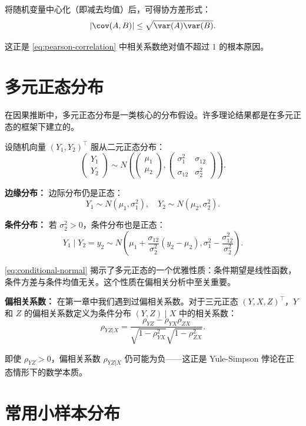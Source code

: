 将随机变量中心化（即减去均值）后，可得协方差形式：
\[
|\cov(A, B)| \leq \sqrt{\var(A)\var(B)} .
\]

这正是 \cref{eq:pearson-correlation} 中相关系数绝对值不超过 $1$ 的根本原因。

\section{多元正态分布}

在因果推断中，多元正态分布是一类核心的分布假设。许多理论结果都是在多元正态的框架下建立的。

设随机向量 $(Y_1, Y_2)^\top$ 服从二元正态分布：
\[
\begin{pmatrix}
Y_1 \\ Y_2
\end{pmatrix}
\sim N\left(
\begin{pmatrix}
\mu_1 \\ \mu_2
\end{pmatrix},
\begin{pmatrix}
\sigma_1^2 & \sigma_{12} \\
\sigma_{12} & \sigma_2^2
\end{pmatrix}
\right) .
\]

\textbf{边缘分布：} 边际分布仍是正态：
\[
Y_1 \sim N(\mu_1, \sigma_1^2), \quad Y_2 \sim N(\mu_2, \sigma_2^2).
\]

\textbf{条件分布：} 若 $\sigma_2^2 > 0$，条件分布也是正态：
\begin{equation}\label{eq:conditional-normal}
Y_1 \mid Y_2 = y_2 \sim N\left(\mu_1 + \frac{\sigma_{12}}{\sigma_2^2}(y_2 - \mu_2), \sigma_1^2 - \frac{\sigma_{12}^2}{\sigma_2^2}\right).
\end{equation}

\cref{eq:conditional-normal} 揭示了多元正态的一个优雅性质：条件期望是线性函数，条件方差与条件均值无关。这个性质在偏相关分析中至关重要。

\textbf{偏相关系数：} 在第一章中我们遇到过偏相关系数。对于三元正态 $(Y, X, Z)^\top$，$Y$ 和 $Z$ 的偏相关系数定义为条件分布 $(Y, Z) \mid X$ 中的相关系数：
\begin{equation}\label{eq:partial-correlation}
\rho_{YZ|X} = \frac{\rho_{YZ} - \rho_{YX}\rho_{ZX}}{\sqrt{1-\rho_{YX}^2}\sqrt{1-\rho_{ZX}^2}} .
\end{equation}

即使 $\rho_{YZ} > 0$，偏相关系数 $\rho_{YZ|X}$ 仍可能为负——这正是 Yule-Simpson 悖论在正态情形下的数学本质。

\section{常用小样本分布}

